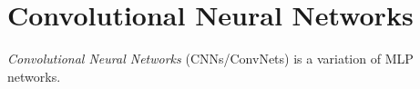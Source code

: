 \section{Convolutional Neural Networks}

\emph{Convolutional Neural Networks} (CNNs/ConvNets) is a variation of MLP networks.